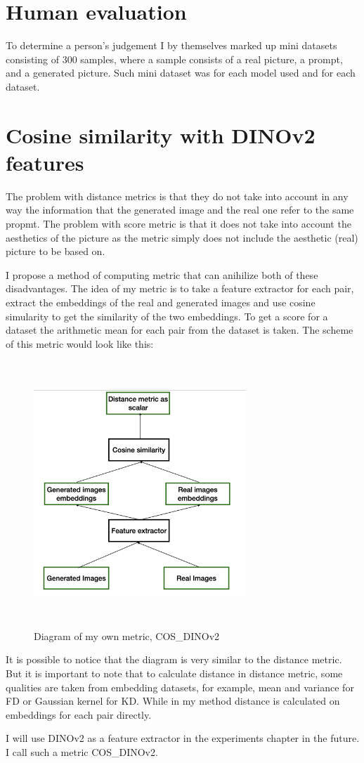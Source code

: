\section{Human evaluation}
To determine a person's judgement I by themselves marked up mini datasets consisting of 300 samples, where a sample consists of a real picture, a prompt, and a generated picture. Such mini dataset was for each model used and for each dataset.

\section{Cosine similarity with DINOv2 features}
The problem with distance metrics is that they do not take into account in any way the information that the generated image and the real one refer to the same propmt. The problem with score metric is that it does not take into account the aesthetics of the picture as the metric simply does not include the aesthetic (real) picture to be based on.

I propose a method of computing metric that can anihilize both of these disadvantages. The idea of my metric is to take a feature extractor for each pair, extract the embeddings of the real and generated images and use cosine simularity to get the similarity of the two embeddings. To get a score for a dataset the arithmetic mean for each pair from the dataset is taken. The scheme of this metric would look like this:
\begin{figure}[hbt]
\centering
\includegraphics[width=8cm, height=10cm]{figs/cos_clip.png}
\caption{Diagram of my own metric, COS\_DINOv2}
\label{fig:cos_dinov2_diagram}
\end{figure}
It is possible to notice that the diagram is very similar to the distance metric. But it is important to note that to calculate distance in distance metric, some qualities are taken from embedding datasets, for example, mean and variance for FD or Gaussian kernel for KD. While in my method distance is calculated on embeddings for each pair directly.

I will use DINOv2 as a feature extractor in the experiments chapter in the future. I call such a metric COS\_DINOv2.
